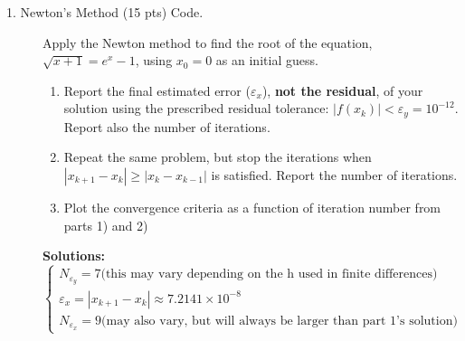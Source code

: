 \documentclass[12pt]{article}
\begin{document}
\begin{description}
\item[1. Newton's Method (15 pts) Code.] Apply the Newton method to find the root of the equation, $\sqrt{x+1} = e^{x} - 1$, using $x_0 = 0$ as an initial guess.
\begin{enumerate}
    \item Report the final estimated error ($ \varepsilon_x$), {\bf not the residual}, of your solution using the prescribed residual tolerance: $| f(x_k) | < \varepsilon_y = 10^{-12}$. Report also the number of iterations. 
    \item Repeat the same problem, but stop the iterations when $| x_{k+1} - x_k | \ge | x_k - x_{k-1} |$ is satisfied. Report the number of iterations.
    \item Plot the convergence criteria as a function of iteration number from parts 1) and 2)
\end{enumerate}

\ifsolution
\color{red}
\textbf{Solutions:} \\
\begin{equation*}
\begin{cases}
N_{\varepsilon_{y}} = 7 \text{(this may vary depending on the h used in finite differences)} \\
\varepsilon_{x} = \left|x_{k+1}-x_{k}\right| \approx 7.2141 \times 10^{-8} \\
N_{\varepsilon_{x}} = 9 \text{(may also vary, but will always be larger than part 1's solution)}
\end{cases}
\end{equation*}


\end{description}
\end{document}
